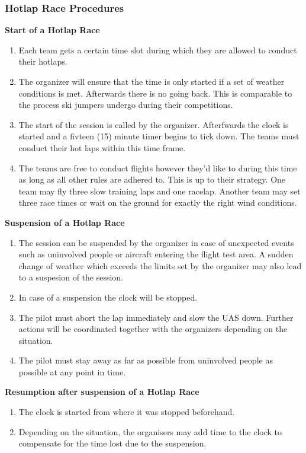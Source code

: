     \subsubsection{Hotlap Race Procedures}
    \textbf{Start of a Hotlap Race}
    \begin{enumerate}
      \item Each team gets a certain time slot during which they are allowed to conduct their hotlaps. 
      \item The organizer will ensure that the time is only started if a set of weather conditions is met. Afterwards there is no going back. This is comparable to the process ski jumpers undergo during their competitions.
      \item The start of the session is called by the organizer. Afterfwards the clock is started and a fivteen (15) minute timer begins to tick down. The teams must conduct their hot laps within this time frame.
      \item The teams are free to conduct flights however they'd like to during this time as long as all other rules are adhered to. This is up to their strategy. One team may fly three slow training laps and one racelap. Another team may set three race times or wait on the ground for exactly the right wind conditions.
    \end{enumerate}
    \textbf{Suspension of a Hotlap Race}
    \begin{enumerate}[resume]
      \item The session can be suspended by the organizer in case of unexpected events such as uninvolved people or aircraft entering the flight test area. A sudden change of weather which exceeds the limits set by the organizer may also lead to a suspesion of the session. 
      \item In case of a suspension the clock will be stopped. 
      \item The pilot must abort the lap immediately and slow the UAS down. Further actions will be coordinated together with the organizers depending on the situation.
      \item The pilot must stay away as far as possible from uninvolved people as possible at any point in time. 
    \end{enumerate}

    \textbf{Resumption after suspension of a Hotlap Race}
    \begin{enumerate}[resume]
      \item The clock is started from where it was stopped beforehand.
      \item Depending on the situation, the organisers may add time to the clock to compensate for the time lost due to the suspension. 
    \end{enumerate}

